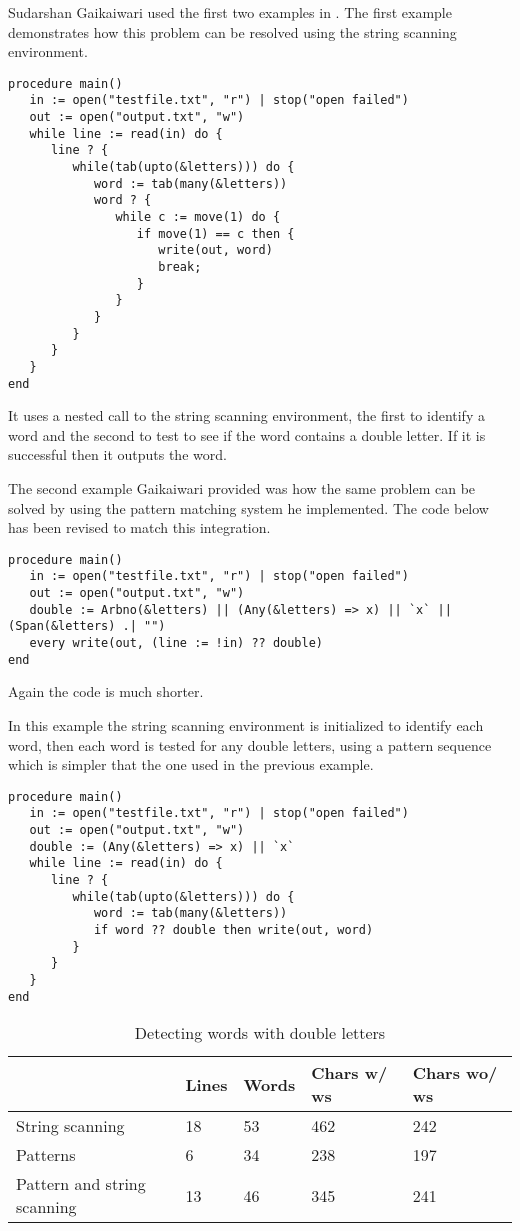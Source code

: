 \documentclass{article}
\begin{document}
Sudarshan Gaikaiwari used the first two examples in \cite{Gaikaiwari2005}.  The first example demonstrates how this problem can be resolved using the string scanning environment.
\begin{verbatim}
procedure main()
   in := open("testfile.txt", "r") | stop("open failed")
   out := open("output.txt", "w")
   while line := read(in) do {
      line ? {
         while(tab(upto(&letters))) do {
            word := tab(many(&letters))
            word ? {
               while c := move(1) do {
                  if move(1) == c then {
                     write(out, word)
                     break;
                  }
               }
            }
         }
      }
   }
end
\end{verbatim}
It uses a nested call to the string scanning environment, the first to identify a word and the second to test to see if the word contains a double letter.  If it is successful then it outputs the word.

The second example Gaikaiwari provided was how the same problem can be solved by using the pattern matching system he implemented.  The code below has been revised to match this integration.
\begin{verbatim}
procedure main()
   in := open("testfile.txt", "r") | stop("open failed")
   out := open("output.txt", "w")
   double := Arbno(&letters) || (Any(&letters) => x) || `x` || (Span(&letters) .| "")
   every write(out, (line := !in) ?? double)
end 
\end{verbatim}
Again the code is much shorter.

In this example the string scanning environment is initialized to identify each word, then each word is tested for any double letters, using a pattern sequence which is simpler that the one used in the previous example.
\begin{verbatim}
procedure main()
   in := open("testfile.txt", "r") | stop("open failed")
   out := open("output.txt", "w")
   double := (Any(&letters) => x) || `x` 
   while line := read(in) do {
      line ? {
         while(tab(upto(&letters))) do {
            word := tab(many(&letters))
            if word ?? double then write(out, word)
         }
      }
   }
end 
\end{verbatim}

\begin{table}[ht]
	\caption{Detecting words with double letters}
	\centering
	\begin{tabular}{|l|l|l|l|l|}
		\hline\hline
		 & Lines & Words & Chars w/ ws & Chars wo/ ws\\
		\hline
		String scanning & 18 & 53 & 462 & 242 \\
		Patterns & 6 & 34 & 238 & 197 \\
		Pattern and string scanning & 13 & 46 & 345 & 241 \\
		\hline
	\end{tabular}
\end{table}
\end{document}
